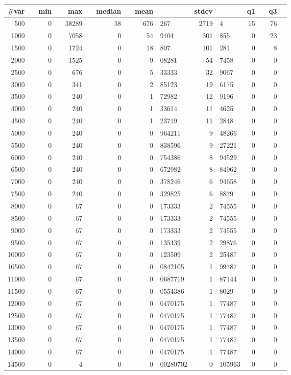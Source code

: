 \begin{tabular}{r@{.}lr@{.}lr@{.}lr@{.}lr@{.}lr@{.}lr@{.}lr@{.}l}
\toprule
\textbf{\#var}&	&\textbf{min}&	&\textbf{max}&	&\textbf{median}&	&\textbf{mean}&	&\textbf{stdev}&	&\textbf{q1}&	&\textbf{q3}&\\\midrule
500&	&0&	&38289&	&38&	&676&267	&2719&4	&15&	&76&\\
1000&	&0&	&7058&	&0&	&54&9404	&301&855	&0&	&23&\\
1500&	&0&	&1724&	&0&	&18&807	&101&281	&0&	&8&\\
2000&	&0&	&1525&	&0&	&9&08281	&54&7458	&0&	&0&\\
2500&	&0&	&676&	&0&	&5&33333	&32&9067	&0&	&0&\\
3000&	&0&	&341&	&0&	&2&85123	&19&6175	&0&	&0&\\
3500&	&0&	&240&	&0&	&1&72982	&12&9196	&0&	&0&\\
4000&	&0&	&240&	&0&	&1&33614	&11&4625	&0&	&0&\\
4500&	&0&	&240&	&0&	&1&23719	&11&2848	&0&	&0&\\
5000&	&0&	&240&	&0&	&0&964211	&9&48266	&0&	&0&\\
5500&	&0&	&240&	&0&	&0&838596	&9&27221	&0&	&0&\\
6000&	&0&	&240&	&0&	&0&754386	&8&94529	&0&	&0&\\
6500&	&0&	&240&	&0&	&0&672982	&8&84962	&0&	&0&\\
7000&	&0&	&240&	&0&	&0&378246	&6&94658	&0&	&0&\\
7500&	&0&	&240&	&0&	&0&329825	&6&8879	&0&	&0&\\
8000&	&0&	&67&	&0&	&0&173333	&2&74555	&0&	&0&\\
8500&	&0&	&67&	&0&	&0&173333	&2&74555	&0&	&0&\\
9000&	&0&	&67&	&0&	&0&173333	&2&74555	&0&	&0&\\
9500&	&0&	&67&	&0&	&0&135439	&2&29876	&0&	&0&\\
10000&	&0&	&67&	&0&	&0&123509	&2&25487	&0&	&0&\\
10500&	&0&	&67&	&0&	&0&0842105	&1&99787	&0&	&0&\\
11000&	&0&	&67&	&0&	&0&0687719	&1&87144	&0&	&0&\\
11500&	&0&	&67&	&0&	&0&0554386	&1&8029	&0&	&0&\\
12000&	&0&	&67&	&0&	&0&0470175	&1&77487	&0&	&0&\\
12500&	&0&	&67&	&0&	&0&0470175	&1&77487	&0&	&0&\\
13000&	&0&	&67&	&0&	&0&0470175	&1&77487	&0&	&0&\\
13500&	&0&	&67&	&0&	&0&0470175	&1&77487	&0&	&0&\\
14000&	&0&	&67&	&0&	&0&0470175	&1&77487	&0&	&0&\\
14500&	&0&	&4&	&0&	&0&00280702	&0&105963	&0&	&0&\\
\bottomrule
\end{tabular}